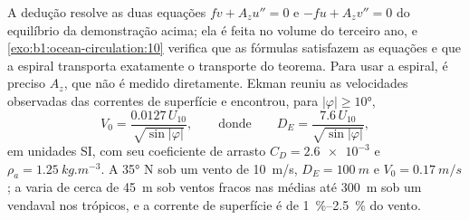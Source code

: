 A dedução resolve as duas equações $f v + A_z u'' = 0$ e $-f u + A_z v'' =
0$ do equilíbrio da demonstração acima; ela é feita no volume do terceiro ano, e
\cref{exo:b1:ocean-circulation:10} verifica que as fórmulas satisfazem as equações
e que a espiral transporta exatamente o transporte do teorema. Para usar a
espiral, é preciso $A_z$, que não é medido diretamente. Ekman reuniu as
velocidades observadas das correntes de superfície e encontrou, para $|\varphi| \geq \ang{10}$,
\[
  V_0 = \frac{0.0127\,U_{10}}{\sqrt{\sin|\varphi|}},
  \qquad\text{donde}\qquad
  D_E = \frac{7.6\,U_{10}}{\sqrt{\sin|\varphi|}},
\]
em unidades SI, com seu coeficiente de arrasto $C_D = \num{2.6e-3}$ e $\rho_a =
\qty{1.25}{kg.m^{-3}}$. A \ang{35} N sob um vento de \qty{10}{m/s}, $D_E =
\qty{100}{m}$ e $V_0 = \qty{0.17}{m/s}$; a  varia de cerca de
\qty{45}{m} sob ventos fracos nas  médias até \qty{300}{m} sob um vendaval nos
trópicos, e a corrente de superfície é de \qtyrange{1}{2.5}{\percent} do vento.

